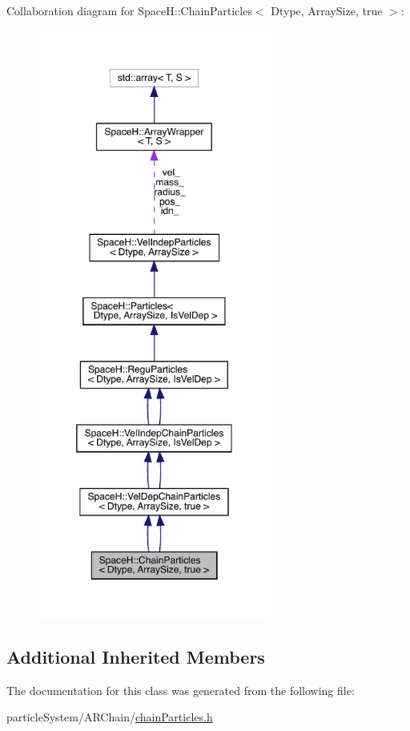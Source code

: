 Collaboration diagram for SpaceH\+:\+:Chain\+Particles$<$ Dtype, Array\+Size, true $>$\+:
\nopagebreak
\begin{figure}[H]
\begin{center}
\leavevmode
\includegraphics[height=550pt]{class_space_h_1_1_chain_particles_3_01_dtype_00_01_array_size_00_01true_01_4__coll__graph}
\end{center}
\end{figure}
\subsection*{Additional Inherited Members}


The documentation for this class was generated from the following file\+:\begin{DoxyCompactItemize}
\item 
particle\+System/\+A\+R\+Chain/\mbox{\hyperlink{chain_particles_8h}{chain\+Particles.\+h}}\end{DoxyCompactItemize}
